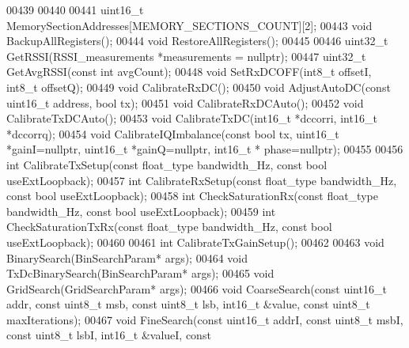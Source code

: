 \begin{DoxyCode}
00439 
00440 
00441     uint16\_t MemorySectionAddresses[MEMORY\_SECTIONS\_COUNT][2];
00443     \textcolor{keywordtype}{void} BackupAllRegisters();
00444     \textcolor{keywordtype}{void} RestoreAllRegisters();
00445     
00446     uint32\_t GetRSSI(RSSI_measurements *measurements = \textcolor{keyword}{nullptr});
00447     uint32\_t GetAvgRSSI(\textcolor{keyword}{const} \textcolor{keywordtype}{int} avgCount);
00448     \textcolor{keywordtype}{void} SetRxDCOFF(int8\_t offsetI, int8\_t offsetQ);
00449     \textcolor{keywordtype}{void} CalibrateRxDC();
00450     \textcolor{keywordtype}{void} AdjustAutoDC(\textcolor{keyword}{const} uint16\_t address, \textcolor{keywordtype}{bool} tx);
00451     \textcolor{keywordtype}{void} CalibrateRxDCAuto();
00452     \textcolor{keywordtype}{void} CalibrateTxDCAuto();
00453     \textcolor{keywordtype}{void} CalibrateTxDC(int16\_t *dccorri, int16\_t *dccorrq);
00454     \textcolor{keywordtype}{void} CalibrateIQImbalance(\textcolor{keyword}{const} \textcolor{keywordtype}{bool} tx, uint16\_t *gainI=\textcolor{keyword}{nullptr}, uint16\_t *gainQ=\textcolor{keyword}{nullptr}, int16\_t *
      phase=\textcolor{keyword}{nullptr});
00455 
00456     \textcolor{keywordtype}{int} CalibrateTxSetup(\textcolor{keyword}{const} float\_type bandwidth\_Hz, \textcolor{keyword}{const} \textcolor{keywordtype}{bool} useExtLoopback);
00457     \textcolor{keywordtype}{int} CalibrateRxSetup(\textcolor{keyword}{const} float\_type bandwidth\_Hz, \textcolor{keyword}{const} \textcolor{keywordtype}{bool} useExtLoopback);
00458     \textcolor{keywordtype}{int} CheckSaturationRx(\textcolor{keyword}{const} float\_type bandwidth\_Hz, \textcolor{keyword}{const} \textcolor{keywordtype}{bool} useExtLoopback);
00459     \textcolor{keywordtype}{int} CheckSaturationTxRx(\textcolor{keyword}{const} float\_type bandwidth\_Hz, \textcolor{keyword}{const} \textcolor{keywordtype}{bool} useExtLoopback);
00460 
00461     \textcolor{keywordtype}{int} CalibrateTxGainSetup();
00462 
00463     \textcolor{keywordtype}{void} BinarySearch(BinSearchParam* args);
00464     \textcolor{keywordtype}{void} TxDcBinarySearch(BinSearchParam* args);
00465     \textcolor{keywordtype}{void} GridSearch(GridSearchParam* args);
00466     \textcolor{keywordtype}{void} CoarseSearch(\textcolor{keyword}{const} uint16\_t addr, \textcolor{keyword}{const} uint8\_t msb, \textcolor{keyword}{const} uint8\_t lsb, int16\_t &value, \textcolor{keyword}{const} 
      uint8\_t maxIterations);
00467     \textcolor{keywordtype}{void} FineSearch(\textcolor{keyword}{const} uint16\_t addrI, \textcolor{keyword}{const} uint8\_t msbI, \textcolor{keyword}{const} uint8\_t lsbI, int16\_t &valueI, \textcolor{keyword}{const} 

\end{DoxyCode}
